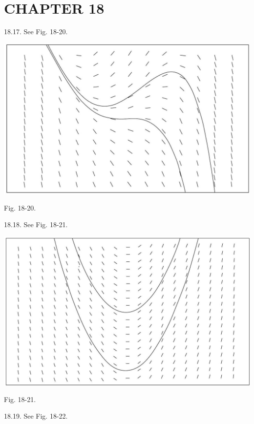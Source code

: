 \documentclass[10pt]{article}
\begin{document}
\section*{CHAPTER 18}
18.17. See Fig. 18-20.

\begin{center}
\includegraphics[max width=\textwidth]{2024_04_03_5bb5b4275a64cb9887d1g-371}
\end{center}

Fig. 18-20.

18.18. See Fig. 18-21.

\begin{center}
\includegraphics[max width=\textwidth]{2024_04_03_5bb5b4275a64cb9887d1g-372}
\end{center}

Fig. 18-21.

18.19. See Fig. 18-22.
\end{document}
